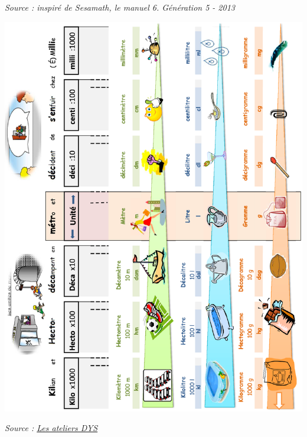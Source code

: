 \begin{colonne*exercice}
\hfill {\footnotesize\it Source : inspiré de Sesamath, le manuel 6. Génération 5 - 2013}
\end{colonne*exercice}


\Recreation
   \includegraphics[width=16.6cm]{tableau_mesures}
   \begin{flushright}
      {\it\footnotesize Source : \href{https://ateliersdys.ch/les-unites-de-mesure}{Les ateliers DYS}}
   \end{flushright}

